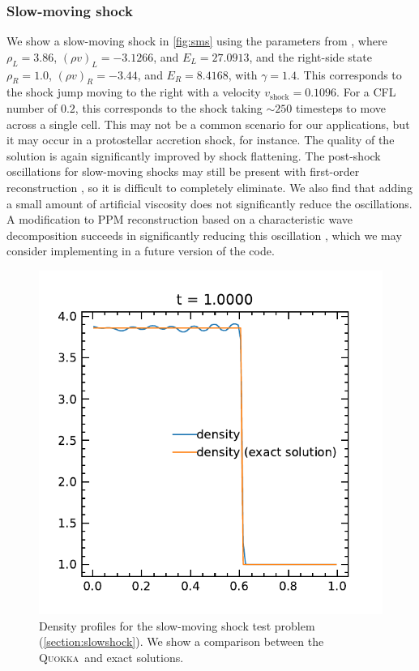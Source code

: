 \documentclass[fleqn,usenatbib]{mnras}
\newcommand{\quokka}{\textsc{Quokka}}
\begin{document}
\subsubsection{Slow-moving shock}
\label{section:slowshock}
We show a slow-moving shock in \autoref{fig:sms} using the parameters from \cite{Jin_1996}, where $\rho_L = 3.86$, $(\rho v)_L = -3.1266$, and $E_L = 27.0913$, and the right-side state $\rho_R = 1.0$, $(\rho v)_R = -3.44$, and $E_R = 8.4168$, with $\gamma = 1.4$. This corresponds to the shock jump moving to the right with a velocity $v_{\text{shock}} = 0.1096$. For a CFL number of $0.2$, this corresponds to the shock taking $\sim 250$ timesteps to move across a single cell. This may not be a common scenario for our applications, but it may occur in a protostellar accretion shock, for instance. The quality of the solution is again significantly improved by shock flattening. The post-shock oscillations for slow-moving shocks may still be present with first-order reconstruction \citep{Jin_1996,Lee_2011}, so it is difficult to completely eliminate. We also find that adding a small amount of artificial viscosity does not significantly reduce the oscillations. A modification to PPM reconstruction based on a characteristic wave decomposition succeeds in significantly reducing this oscillation \citep{Lee_2011}, which we may consider implementing in a future version of the code.
\begin{figure}
    \includegraphics[width=\columnwidth]{hydro_sms_1.0000.pdf}
    \caption{Density profiles for the slow-moving shock test problem (\autoref{section:slowshock}). We show a comparison between the \quokka~and exact solutions.}
    \label{fig:sms}
\end{figure}
\end{document}

